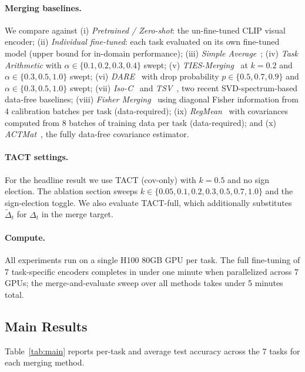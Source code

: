 \documentclass{article}
\theoremstyle{plain}
\theoremstyle{definition}
\theoremstyle{remark}
\begin{document}
\paragraph{Merging baselines.}
We compare against (i) \emph{Pretrained / Zero-shot}: the un-fine-tuned CLIP visual encoder; (ii) \emph{Individual fine-tuned}: each task evaluated on its own fine-tuned model (upper bound for in-domain performance); (iii) \emph{Simple Average}~\citep{wortsman2022model}; (iv) \emph{Task Arithmetic} with $\alpha\in\{0.1,0.2,0.3,0.4\}$ swept; (v) \emph{TIES-Merging}~\citep{yadav2023ties} at $k=0.2$ and $\alpha\in\{0.3,0.5,1.0\}$ swept; (vi) \emph{DARE}~\citep{yu2024language} with drop probability $p\in\{0.5,0.7,0.9\}$ and $\alpha\in\{0.3,0.5,1.0\}$ swept; (vii) \emph{Iso-C}~\citep{marczak2025isoc} and \emph{TSV}~\citep{gargiulo2025tsv}, two recent SVD-spectrum-based data-free baselines; (viii) \emph{Fisher Merging}~\citep{matena2022merging} using diagonal Fisher information from 4 calibration batches per task (data-required); (ix) \emph{RegMean}~\citep{jin2023dataless} with covariances computed from 8 batches of training data per task (data-required); and (x) \emph{ACTMat}~\citep{hameed2026actmat}, the fully data-free covariance estimator.

\paragraph{TACT settings.} For the headline result we use TACT (cov-only) with $k=0.5$ and no sign election. The ablation section sweeps $k \in \{0.05, 0.1, 0.2, 0.3, 0.5, 0.7, 1.0\}$ and the sign-election toggle. We also evaluate TACT-full, which additionally substitutes $\tilde\Delta_t$ for $\Delta_t$ in the merge target.

\paragraph{Compute.} All experiments run on a single H100 80GB GPU per task. The full fine-tuning of 7 task-specific encoders completes in under one minute when parallelized across 7 GPUs; the merge-and-evaluate sweep over all methods takes under 5 minutes total.

\subsection{Main Results}
\label{sec:exp_main}

Table~\ref{tab:main} reports per-task and average test accuracy across the 7 tasks for each merging method.
\end{document}
